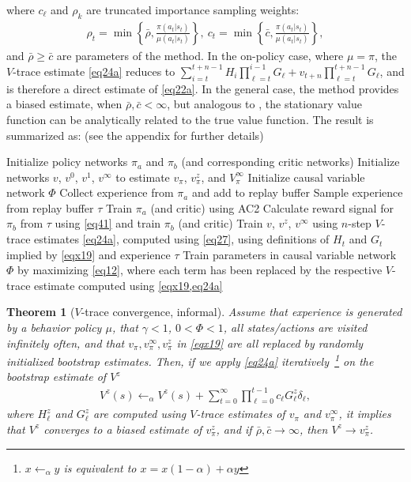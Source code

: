 \documentclass[letterpaper]{article} %
\newtheorem{theorem}{Theorem}%
\begin{document}
	where $c_\ell$ and $\rho_k$ are truncated importance sampling weights:
	\begin{align}
		\rho_t = \min\left\{\bar \rho, \frac{\pi(a_t | s_t)  }{\mu(a_t | s_t) }  \right\},\
		c_t = \min\left\{\bar c, \frac{\pi(a_t | s_t)  }{\mu(a_t | s_t) }  \right\}, \nonumber
	\end{align}
	and $\bar \rho \geq \bar c$ are parameters of the method. In the on-policy case, where $\mu = \pi$, the $V$-trace estimate \cref{eq24a} reduces to $\sum_{i=t}^{t+n-1} H_i \prod_{\ell=t}^{i-1} G_\ell + v_{t+n}  \prod_{\ell = t}^{ t+n-1} G_\ell$,
	and is therefore a direct estimate of \cref{eq22a}. In the general case, the method provides a biased estimate, when $\bar \rho, \bar c < \infty$, but analogous to \citet{espeholt2018impala}, the stationary value function can be analytically related to the true value function. The result is summarized as: (see the appendix for further details)
	\begin{algorithm}[t]
		\caption{Causal learner}\label{alg1}
		\begin{algorithmic}[1]
			\STATE Initialize policy networks $\pi_a$ and $\pi_b$ (and corresponding critic networks)
			\STATE Initialize networks $v$, $v^{0}$, $v^{1}$, $v^{\infty}$ to estimate $v_\pi$, $v^{z}_\pi$,  and $V^\infty_\pi$
			\STATE Initialize causal variable network $\Phi$
			\REPEAT
			\STATE Collect experience from $\pi_a$ and add to replay buffer
			\STATE Sample experience from replay buffer $\tau$
			\STATE Train $\pi_a$ (and critic) using AC2
			\STATE Calculate reward signal for $\pi_b$ from $\tau$ using \cref{eq41} and train $\pi_b$ (and critic)
			\STATE Train $v$, $v^{z}$, $v^{\infty}$ using $n$-step $V$-trace estimates \cref{eq24a}, computed using \cref{eq27}, using definitions of $H_t$ and $G_t$ implied by \cref{eqx19} and experience $\tau$
			\STATE Train parameters in causal variable network $\Phi$ by maximizing \cref{eq12}, where each term has been replaced by the respective $V$-trace estimate computed using \cref{eqx19,eq24a}
			\UNTIL{forever}
		\end{algorithmic}
	\end{algorithm}

	\begin{theorem}[$V$-trace convergence, informal]	\label{T2}
		Assume that experience is generated by a behavior policy $\mu$, that  $\gamma<1$, $0<\Phi<1$, all states/actions are visited infinitely often, and that $v_\pi, v^\infty_\pi, v^z_\pi$ in \cref{eqx19} are all replaced by randomly initialized bootstrap estimates. Then, if we apply \cref{eq24a} iteratively~\footnote{$x \leftarrow_\alpha y$ is equivalent to $x = x(1-\alpha) + \alpha y$} on the bootstrap estimate of $V^z$
		\begin{align}
			V^z(s) \leftarrow_\alpha V^z(s) + \sum_{t=0}^{\infty} \prod_{\ell =0}^{t-1} c_\ell G_\ell^z \delta_\ell,
		\end{align}
		where $H_\ell^z$ and $G^z_\ell$ are computed using $V$-trace estimates of $v_\pi$ and $v^\infty_\pi$, it implies that $V^z$ converges to a biased estimate of $v^z_\pi$, and if $\bar \rho, \bar c \rightarrow \infty$, then $V^z \rightarrow v_\pi^z$.
	\end{theorem}
\end{document}
